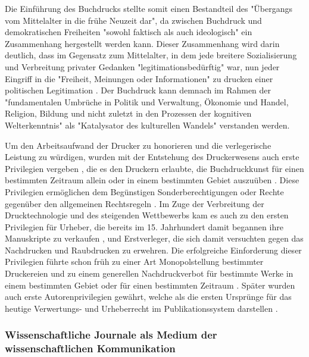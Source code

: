 Die Einführung des Buchdrucks stellte somit einen Bestandteil des "Übergangs vom Mittelalter in die frühe Neuzeit dar"\cite{lange2008medienwettbewerb}, da zwischen Buchdruck und demokratischen Freiheiten "sowohl faktisch als auch ideologisch" \cite{suchen} ein Zusammenhang hergestellt werden kann. Dieser Zusammenhang wird darin deutlich, dass im Gegensatz zum Mittelalter, in dem jede breitere Sozialisierung und Verbreitung privater Gedanken "legitimationsbedürftig" war, nun jeder Eingriff in die "Freiheit, Meinungen oder Informationen" zu drucken einer politischen Legitimation \cite{giesecke_1991_buchdruck}. Der Buchdruck kann demnach im Rahmen der "fundamentalen Umbrüche in Politik und Verwaltung, Ökonomie und Handel, Religion, Bildung und nicht zuletzt in den Prozessen der kognitiven Welterkenntnis" \cite{pscheida_2010_wikipedia} als "Katalysator des kulturellen Wandels"\cite{giesecke_1991_buchdruck} verstanden werden.

Um den Arbeitsaufwand der Drucker zu honorieren und die verlegerische Leistung zu würdigen\cite{szilagyi_2011_leistungsschutzrecht}, wurden mit der Entstehung des Druckerwesens auch erste Privilegien vergeben \cite{gieseke_1995_privileg}, die es den Druckern erlaubte, die Buchdruckkunst für einen bestimmten Zeitraum allein oder in einem bestimmten Gebiet auszuüben \cite{martin2008publizistische} \cite{koller_1995_Urheberrecht}. Diese Privilegien ermöglichen dem Begünstigen Sonderberechtigungen oder Rechte gegenüber den allgemeinen Rechtsregeln \cite{jaenich_2002_geistiges}. Im Zuge der Verbreitung der Drucktechnologie und des steigenden Wettbewerbs kam es auch zu den ersten Privilegien für Urheber, die bereits im 15. Jahrhundert damit begannen ihre Manuskripte zu verkaufen \cite{hesse2002rise}, und Erstverleger, die sich damit versuchten gegen das Nachdrucken und Raubdrucken zu erwehren. Die erfolgreiche Einforderung dieser Privilegien führte schon früh zu einer Art Monopolstellung bestimmter Druckereien und zu einem generellen Nachdruckverbot für bestimmte Werke in einem bestimmten Gebiet oder für einen bestimmten Zeitraum \cite{szilagyi_2011_leistungsschutzrecht} \cite{hesse2002rise}. Später wurden auch erste Autorenprivilegien gewährt, welche als die ersten Ursprünge für das heutige Verwertungs- und Urheberrecht im Publikationssystem darstellen \cite{koller_1995_Urheberrecht}.

\subsubsection{Wissenschaftliche Journale als Medium der wissenschaftlichen Kommunikation}

